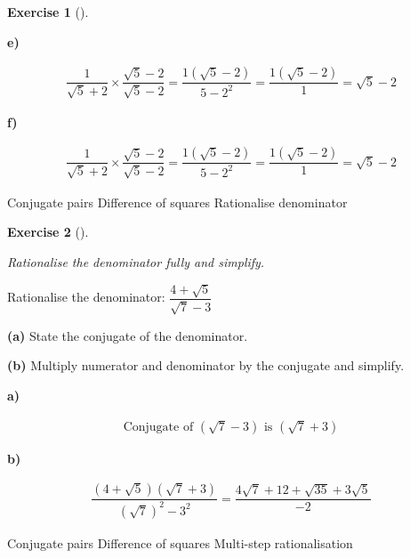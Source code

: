 \documentclass[
  letterpaper,
  DIV=11,
  numbers=noendperiod]{scrreprt}
\theoremstyle{definition}
\newtheorem{exercise}{Exercise}[chapter]
\theoremstyle{remark}
\begin{document}
\begin{exercise}[]
\begin{tcolorbox}
\textbf{e)}

\[
\begin{aligned}
\dfrac{1}{\sqrt{5}+2}\times\dfrac{\sqrt{5}-2}{\sqrt{5}-2}=\dfrac{1(\sqrt{5}-2)}{5-2^2}=\dfrac{1(\sqrt{5}-2)}{1}=\sqrt{5}-2
\end{aligned}
\]

\textbf{f)}

\[
\begin{aligned}
\dfrac{1}{\sqrt{5}+2}\times\dfrac{\sqrt{5}-2}{\sqrt{5}-2}=\dfrac{1(\sqrt{5}-2)}{5-2^2}=\dfrac{1(\sqrt{5}-2)}{1}=\sqrt{5}-2
\end{aligned}
\]

\end{tcolorbox}

{Conjugate pairs} {Difference of squares} {Rationalise denominator}

\end{exercise}

\begin{exercise}[]\protect\hypertarget{exr-u2-54}{}\label{exr-u2-54}

\emph{Rationalise the denominator fully and simplify.}

Rationalise the denominator: \(\dfrac{4+\sqrt{5}}{\sqrt{7}-3}\)

\textbf{(a)} State the conjugate of the denominator.

\textbf{(b)} Multiply numerator and denominator by the conjugate and
simplify.

\begin{tcolorbox}[enhanced jigsaw, opacitybacktitle=0.6, coltitle=black, arc=.35mm, colframe=quarto-callout-tip-color-frame, colback=white, bottomrule=.15mm, left=2mm, colbacktitle=quarto-callout-tip-color!10!white, titlerule=0mm, opacityback=0, title=\textcolor{quarto-callout-tip-color}{\faLightbulb}\hspace{0.5em}{🔍 View Solution}, leftrule=.75mm, breakable, rightrule=.15mm, bottomtitle=1mm, toptitle=1mm, toprule=.15mm]

\textbf{a)}

\[
\begin{aligned}
\text{Conjugate of }(\sqrt{7}-3)\text{ is }(\sqrt{7}+3)
\end{aligned}
\]

\textbf{b)}

\[
\begin{aligned}
\dfrac{(4+\sqrt{5})(\sqrt{7}+3)}{(\sqrt{7})^2-3^2}=\dfrac{4\sqrt{7}+12+\sqrt{35}+3\sqrt{5}}{-2}
\end{aligned}
\]

\end{tcolorbox}

{Conjugate pairs} {Difference of squares} {Multi-step rationalisation}

\end{exercise}
\end{document}
